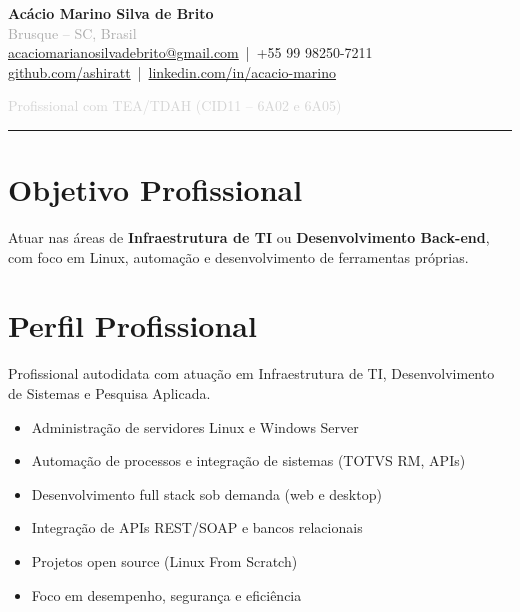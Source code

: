 \documentclass[11pt,a4paper]{article}
\begin{document}
\begin{center}
    {\LARGE\textbf{Acácio Marino Silva de Brito}}\\[6pt]
    
    {\small \textcolor{darkgray}{Brusque -- SC, Brasil}}\\[4pt]
    
    \href{mailto:acaciomarianosilvadebrito@gmail.com}{acaciomarianosilvadebrito@gmail.com}
    \,|\, +55 99 98250-7211\\
    
    \href{https://github.com/ashiratt}{github.com/ashiratt}
    \,|\, 
    \href{https://linkedin.com/in/acacio-marino}{linkedin.com/in/acacio-marino}
    
    \vspace{6pt}
    {\footnotesize \textcolor{lightgray}{Profissional com TEA/TDAH (CID11 – 6A02 e 6A05)}}
\end{center}

\vspace{6pt}
\hrule
\vspace{10pt}

\section{Objetivo Profissional}
Atuar nas áreas de \textbf{Infraestrutura de TI} ou \textbf{Desenvolvimento Back-end}, com foco em Linux, automação e desenvolvimento de ferramentas próprias.

\section{Perfil Profissional}
Profissional autodidata com atuação em Infraestrutura de TI, Desenvolvimento de Sistemas e Pesquisa Aplicada.

\begin{itemize}
    \item Administração de servidores Linux e Windows Server
    \item Automação de processos e integração de sistemas (TOTVS RM, APIs)
    \item Desenvolvimento full stack sob demanda (web e desktop)
    \item Integração de APIs REST/SOAP e bancos relacionais
    \item Projetos open source (Linux From Scratch)
    \item Foco em desempenho, segurança e eficiência
\end{itemize}
\end{document}
